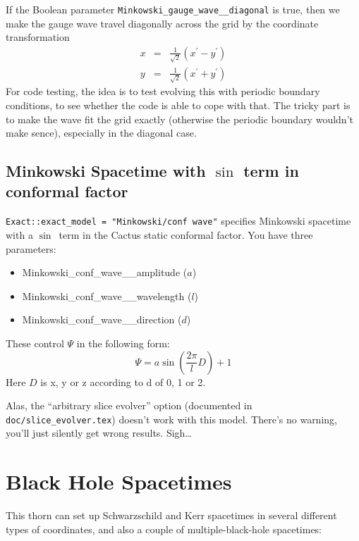 If the Boolean parameter \verb|Minkowski_gauge_wave__diagonal| is
true, then we make the gauge wave travel diagonally across the grid by
the coordinate transformation
\begin{eqnarray}
x &=& \frac{1}{\sqrt{2}}(x^\prime - y^\prime)				\\
y &=& \frac{1}{\sqrt{2}}(x^\prime + y^\prime)				%
\end{eqnarray}
For code testing, the idea is to test evolving this with periodic
boundary conditions, to see whether the code is able to cope with
that.  The tricky part is to make the wave fit the grid exactly
(otherwise the periodic boundary wouldn't make sence), especially in
the diagonal case.


\subsection{Minkowski Spacetime with $\sin$ term in conformal factor}

\verb|Exact::exact_model = "Minkowski/conf wave"| specifies Minkowski
spacetime with a $\sin$~term in the Cactus static conformal factor.
You have three parameters:
\begin{itemize}
 \item Minkowski\_conf\_wave\_\_amplitude ($a$)
 \item Minkowski\_conf\_wave\_\_wavelength ($l$)
 \item Minkowski\_conf\_wave\_\_direction ($d$)
\end{itemize}
These control $\Psi$ in the following form:
\begin{equation}
 \Psi=a\sin\left(\frac{2\pi}{l}D\right)+1
\end{equation}
Here $D$ is x, y or z according to d of 0, 1 or 2.

Alas, the ``arbitrary slice evolver'' option
(documented in \verb|doc/slice_evolver.tex|)
doesn't work with this model.  There's no warning,
you'll just silently get wrong results.  Sigh\dots


\section{Black Hole Spacetimes}

This thorn can set up Schwarzschild and Kerr spacetimes in several
different types of coordinates, and also a couple of multiple-black-hole
spacetimes:

